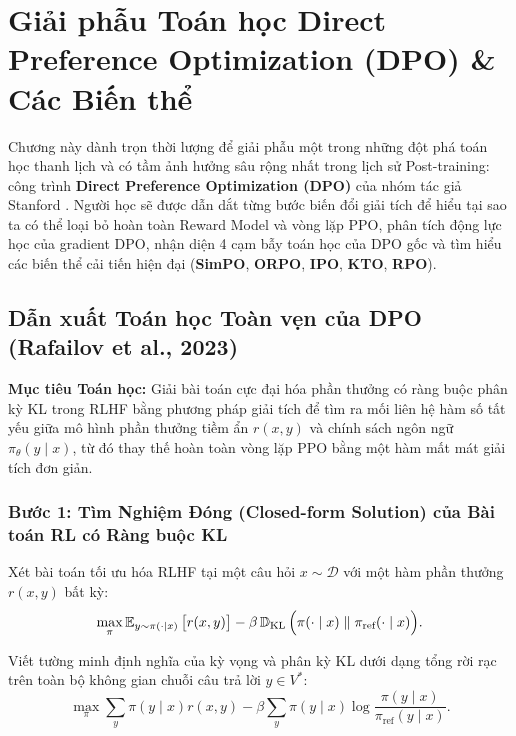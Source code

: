 ﻿\chapter{Giải phẫu Toán học Direct Preference Optimization (DPO) \& Các Biến thể}
\label{chap:dpo}

\begin{pedagogy}
Chương này dành trọn thời lượng để giải phẫu một trong những đột phá toán học thanh lịch và có tầm ảnh hưởng sâu rộng nhất trong lịch sử Post-training: công trình \textbf{Direct Preference Optimization (DPO)} của nhóm tác giả Stanford \citep{rafailov2023direct}. Người học sẽ được dẫn dắt từng bước biến đổi giải tích để hiểu tại sao ta có thể loại bỏ hoàn toàn Reward Model và vòng lặp PPO, phân tích động lực học của gradient DPO, nhận diện 4 cạm bẫy toán học của DPO gốc và tìm hiểu các biến thể cải tiến hiện đại (\textbf{SimPO}, \textbf{ORPO}, \textbf{IPO}, \textbf{KTO}, \textbf{RPO}).
\end{pedagogy}

\section{Dẫn xuất Toán học Toàn vẹn của DPO (Rafailov et al., 2023)}
\label{sec:dpo_derivation}

\textbf{Mục tiêu Toán học:} Giải bài toán cực đại hóa phần thưởng có ràng buộc phân kỳ KL trong RLHF bằng phương pháp giải tích để tìm ra mối liên hệ hàm số tất yếu giữa mô hình phần thưởng tiềm ẩn $r(x, y)$ và chính sách ngôn ngữ $\pi_\theta(y \mid x)$, từ đó thay thế hoàn toàn vòng lặp PPO bằng một hàm mất mát giải tích đơn giản.

\subsection{Bước 1: Tìm Nghiệm Đóng (Closed-form Solution) của Bài toán RL có Ràng buộc KL}
Xét bài toán tối ưu hóa RLHF tại một câu hỏi $x \sim \mathcal{D}$ với một hàm phần thưởng $r(x, y)$ bất kỳ:
\begin{equation}
    \max_{\pi} \operatorname{\mathbb{E}}_{y \sim \pi(\cdot \mid x)} \big[ r(x, y) \big] - \beta \operatorname{\mathbb{D}_{\mathrm{KL}}}\Big(\pi(\cdot \mid x) \parallel \pi_{\text{ref}}(\cdot \mid x)\Big).
    \label{eq:dpo_start}
\end{equation}

Viết tường minh định nghĩa của kỳ vọng và phân kỳ KL dưới dạng tổng rời rạc trên toàn bộ không gian chuỗi câu trả lời $y \in V^*$:
\begin{equation}
    \max_{\pi} \sum_{y} \pi(y \mid x) r(x, y) - \beta \sum_{y} \pi(y \mid x) \log \frac{\pi(y \mid x)}{\pi_{\text{ref}}(y \mid x)}.
\end{equation}

